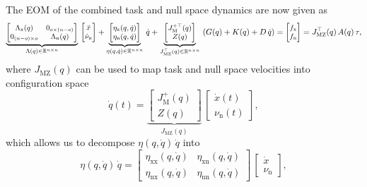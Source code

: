 The \gls{EOM} of the combined task and null space dynamics are now given as~\citep{ott2008cartesian}
\begin{equation}\small
    \underbrace{\begin{bmatrix}
        \Lambda_\mathrm{x}(q) & 0_{o \times (n-o)}\\
        0_{(n-o) \times o} & \Lambda_\mathrm{n}(q)
    \end{bmatrix}}_{\Lambda(q) \in \mathbb{R}^{n \times n}} \, \begin{bmatrix}
        \ddot{x}\\
        \dot{\nu}_\mathrm{n}
    \end{bmatrix} + \underbrace{\begin{bmatrix}
        \eta_\mathrm{x}(q, \dot{q})\\
        \eta_\mathrm{n}(q, \dot{q})
    \end{bmatrix}}_{\eta(q,\dot{q}) \in \mathbb{R}^{n \times n} } \, \dot{q} + \underbrace{\begin{bmatrix}
        J_\mathrm{M}^{+\top}(q)\\
        Z(q)
    \end{bmatrix}}_{J_\mathrm{MZ}^\top(q) \in \mathbb{R}^{n \times n}} \, \left ( G(q) + K(q) + D \, \dot{q} \right ) = \begin{bmatrix}
        f_\mathrm{x}\\ f_\mathrm{n}
    \end{bmatrix} = J_\mathrm{MZ}^\top(q) \, A(q) \, \tau,
\end{equation}
where $J_\mathrm{MZ}(q)$ can be used to map task and null space velocities into configuration space~\citep{ott2008cartesian}
\begin{equation}
    \dot{q}(t) = \underbrace{\begin{bmatrix}
        J_\mathrm{M}^{+}(q)\\
        Z(q)
    \end{bmatrix}}_{J_\mathrm{MZ}(q)} \, \begin{bmatrix}
        \dot{x}(t)\\ \nu_\mathrm{n}(t)
    \end{bmatrix},
\end{equation}
which allows us to decompose $\eta(q,\dot{q}) \, \dot{q}$ into
\begin{equation}
    \eta(q,\dot{q}) \, \dot{q} = \begin{bmatrix}
        \eta_\mathrm{xx}(q,\dot{q}) & \eta_\mathrm{xn}(q,\dot{q})\\
        \eta_\mathrm{nx}(q,\dot{q}) & \eta_\mathrm{nn}(q,\dot{q})
    \end{bmatrix} \, \begin{bmatrix}
        \dot{x}\\ \nu_\mathrm{n}
    \end{bmatrix},
\end{equation}
